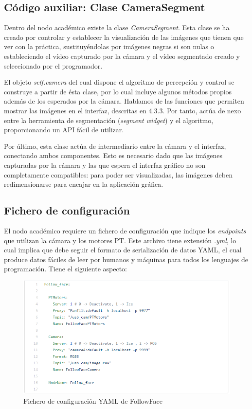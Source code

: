 \subsection{Código auxiliar: Clase CameraSegment}
Dentro del nodo académico existe la clase \textit{CameraSegment}. Esta clase se ha creado por controlar y establecer la visualización de las imágenes que tienen que ver con la práctica, sustituyéndolas por imágenes negras si son nulas o estableciendo el vídeo capturado por la cámara y el vídeo segmentado creado y seleccionado por el programador.

El objeto \textit{self.camera} del cual dispone el algoritmo de percepción y control se construye a partir de ésta clase, por lo cual incluye algunos métodos propios además de los esperados por la cámara. Hablamos de las funciones que permiten mostrar las imágenes en el interfaz, descritas en 4.3.3. Por tanto, actúa de nexo entre la herramienta de segmentación (\textit{segment widget}) y el algoritmo, proporcionando un API fácil de utilizar.

Por último, esta clase actúa de intermediario entre la cámara y el interfaz, conectando ambos componentes. Esto es necesario dado que las imágenes capturadas por la cámara y las que espera el interfaz gráfico no son completamente compatibles: para poder ser visualizadas, las imágenes deben redimensionarse para encajar en la aplicación gráfica.

\subsection{Fichero de configuración}
El nodo académico requiere un fichero de configuración que indique los \textit{endpoints} que utilizan la cámara y los motores PT. Este archivo tiene extensión \textit{.yml}, lo cual implica que debe seguir el formato de serialización de datos YAML, el cual produce datos fáciles de leer por humanos y máquinas para todos los lenguajes de programación. Tiene el siguiente aspecto:

\begin{figure}[H]
  \begin{center}
    \includegraphics[width=0.99\linewidth]{figures/ymlfollowface.png}
		\caption{Fichero de configuración YAML de FollowFace}
		\label{fig.followfaceconf}
		\end{center}
\end{figure}

